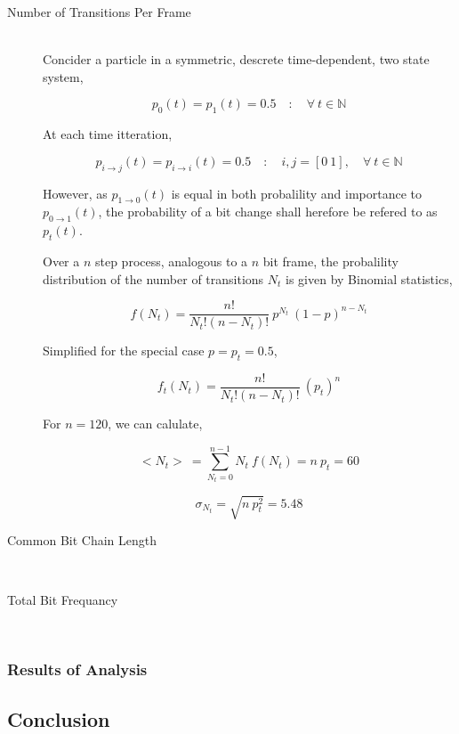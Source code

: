			\begin{description}
				\item[Number of Transitions Per Frame] \hfill \\
					
					Concider a particle in a symmetric, descrete time-dependent, two state system,

					\begin{equation}
						p_0(t) = p_1(t) = 0.5 \quad : \quad \forall\ t \in \mathbb{N}
					\end{equation}

					At each time itteration,

					\begin{equation}
						p_{i \to j}(t) = p_{i \to i}(t) = 0.5 \quad : \quad i,j = [0 \ 1], \quad \forall\ t \in \mathbb{N}
					\end{equation}

					However, as $p_{1 \to 0}(t)$ is equal in both probalility and importance to $p_{0 \to 1}(t)$, the probability of a bit change shall herefore be refered to as $p_{t}(t)$.
					\par
					Over a $n$ step process, analogous to a $n$ bit frame, the probalility distribution of the number of transitions $N_t$ is given by Binomial statistics,

					\begin{equation}
						f(N_{t}) = \frac{n!}{N_{t}!(n-N_{t})!}\ p^{N_{t}}\ (1 - p)^{n-N_{t}}
					\end{equation}

					Simplified for the special case $p = p_{t} = 0.5$,

					\begin{equation}
						f_{t}(N_{t}) = \frac{n!}{N_{t}!(n-N_{t})!}\ (p_{t})^{n}
					\end{equation}

					For $n = 120$, we can calulate,

					\begin{equation}
						<N_{t}> \ = \sum_{N_{t}=0}^{n-1} N_{t}\ f(N_{t}) = n\ p_{t} = 60
						\label{eqn:tansition-expectation}
					\end{equation}

					\begin{equation}
						\sigma_{N_{t}} = \sqrt{ n\ p_{t}^2} = 5.48
					\end{equation}

				\item[Common Bit Chain Length] \hfill \\
					

				\item[Total Bit Frequancy] \hfill \\
					
			\end{description}	

		\subsubsection{Results of Analysis}

	\subsection{Conclusion}
